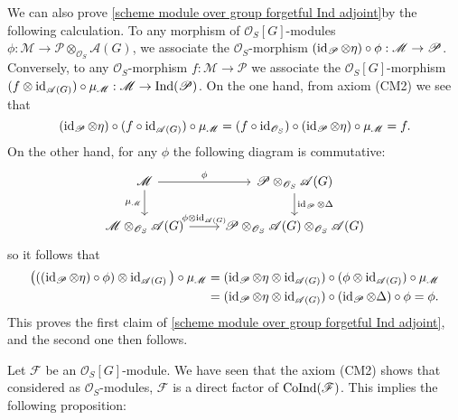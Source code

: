 \begin{remark}
We can also prove \cref{scheme module over group forgetful Ind adjoint}by the following calculation. To any morphism of $\mathscr{O}_S[G]$-modules $\phi:\mathscr{M}\to\mathscr{P}\otimes_{\mathscr{O}_S}\mathscr{A}(G)$, we associate the $\mathscr{O}_S$-morphism $(\operatorname{id}_\mathscr{P}\otimes\eta)\circ\phi:\mathscr{M}\to\mathscr{P}$. Conversely, to any $\mathscr{O}_S$-morphism $f:\mathscr{M}\to\mathscr{P}$ we associate the $\mathscr{O}_S[G]$-morphism $(f\otimes\operatorname{id}_{\mathscr{A}(G)})\circ\mu_\mathscr{M}:\mathscr{M}\to\mathrm{Ind}(\mathscr{P})$. On the one hand, from axiom (CM2) we see that
\[(\operatorname{id}_\mathscr{P}\otimes\eta)\circ(f\circ\operatorname{id}_{\mathscr{A}(G)})\circ\mu_\mathscr{M}=(f\circ\operatorname{id}_{\mathscr{O}_S})\circ(\operatorname{id}_\mathscr{P}\otimes\eta)\circ\mu_\mathscr{M}=f.\]
On the other hand, for any $\phi$ the following diagram is commutative:
\[\begin{tikzcd}
\mathscr{M}\ar[r,"\phi"]\ar[d,swap,"\mu_\mathscr{M}"]&\mathscr{P}\otimes_{\mathscr{O}_S}\mathscr{A}(G)\ar[d,"\id_\mathscr{P}\otimes\Delta"]\\
\mathscr{M}\otimes_{\mathscr{O}_S}\mathscr{A}(G)\ar[r,"\phi\otimes\id_{\mathscr{A}(G)}"]&\mathscr{P}\otimes_{\mathscr{O}_S}\mathscr{A}(G)\otimes_{\mathscr{O}_S}\mathscr{A}(G)
\end{tikzcd}\]
so it follows that
\begin{align*}
\big(((\operatorname{id}_\mathscr{P}\otimes\eta)\circ\phi)\otimes\operatorname{id}_{\mathscr{A}(G)}\big)\circ\mu_\mathscr{M}&=(\operatorname{id}_\mathscr{P}\otimes\eta\otimes\operatorname{id}_{\mathscr{A}(G)})\circ(\phi\otimes\operatorname{id}_{\mathscr{A}(G)})\circ\mu_\mathscr{M}\\
&=(\operatorname{id}_\mathscr{P}\otimes\eta\otimes\operatorname{id}_{\mathscr{A}(G)})\circ(\operatorname{id}_\mathscr{P}\otimes\Delta)\circ\phi=\phi.
\end{align*}
This proves the first claim of \cref{scheme module over group forgetful Ind adjoint}, and the second one then follows.
\end{remark}

Let $\mathscr{F}$ be an $\mathscr{O}_S[G]$-module. We have seen that the axiom (CM2) shows that considered as $\mathscr{O}_S$-modules, $\mathscr{F}$ is a direct factor of $\mathrm{CoInd}(\mathscr{F})$. This implies the following proposition:

